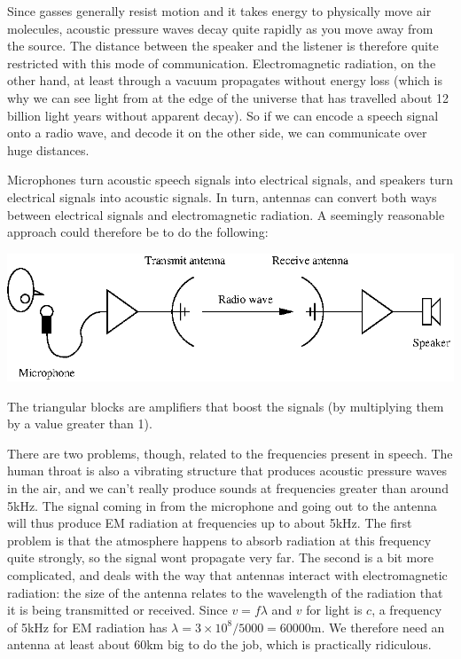 \documentclass[10pt]{beamer}
\begin{document}
Since gasses generally resist motion and it takes energy to physically move air molecules, acoustic pressure waves decay quite rapidly as you move away from the source.  The distance between the speaker and the listener is therefore quite restricted with this mode of communication.  Electromagnetic radiation, on the other hand, at least through a vacuum propagates without energy loss (which is why we can see light from at the edge of the universe that has travelled about 12 billion light years without apparent decay).  So if we can encode a speech signal onto a radio wave, and decode it on the other side, we can communicate over huge distances.

Microphones turn acoustic speech signals into electrical signals, and speakers turn electrical signals into acoustic signals.  In turn, antennas can convert both ways between electrical signals and electromagnetic radiation.  A seemingly reasonable approach could therefore be to do the following:
\begin{center}
  \includegraphics{radiocomms1}
\end{center}
The triangular blocks are amplifiers that boost the signals (by multiplying them by a value greater than 1).

There are two problems, though, related to the frequencies present in speech.  The human throat is also a vibrating structure that produces acoustic pressure waves in the air, and we can't really produce sounds at frequencies greater than around 5kHz.  The signal coming in from the microphone and going out to the antenna will thus produce EM radiation at frequencies up to about 5kHz.  The first problem is that the atmosphere happens to absorb radiation at this frequency quite strongly, so the signal wont propagate very far.  The second is a bit more complicated, and deals with the way that antennas interact with electromagnetic radiation:  the size of the antenna relates to the wavelength of the radiation that it is being transmitted or received.  Since $v = f \lambda$ and $v$ for light is $c$, a frequency of 5kHz for EM radiation has $\lambda = 3 \times 10^8/5000 = 60000$m.  We therefore need an antenna at least about 60km big to do the job, which is practically ridiculous.
\end{document}
